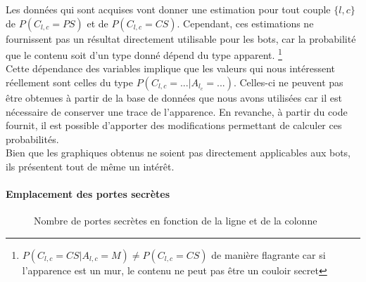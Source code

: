 \documentclass[a4paper,12pt]{article}
\begin{document}
Les données qui sont acquises vont donner une estimation pour tout couple
$\{l,c\}$ de $P(C_{l,c} = PS)$ et de $P(C_{l,c} = CS)$. Cependant, ces estimations
ne fournissent pas un résultat directement utilisable pour les bots, car la
probabilité que le contenu soit d'un type donné dépend du type apparent.
\footnote{$P(C_{l,c} = CS | A_{l,c} = M) \neq P(C_{l,c} = CS)$ de manière flagrante
  car si l'apparence est un mur, le contenu ne peut pas être un couloir secret}
\\
Cette dépendance des variables implique que les valeurs qui nous intéressent
réellement sont celles du type $P(C_{l,c} = ... | A_{l_c} = ...)$. Celles-ci ne
peuvent pas être obtenues à partir de la base de données que nous avons
utilisées car il est nécessaire de conserver une trace de l'apparence. En
revanche, à partir du code fournit, il est possible d'apporter des modifications
permettant de calculer ces probabilités.
\\
Bien que les graphiques obtenus ne soient pas directement applicables aux bots,
ils présentent tout de même un intérêt.

\paragraph{Emplacement des portes secrètes}

\begin{figure}[H]
  \caption{\label{fig:3d_sdoors_graph} Nombre de portes secrètes en fonction
    de la ligne et de la colonne}
\end{figure}
\end{document}
